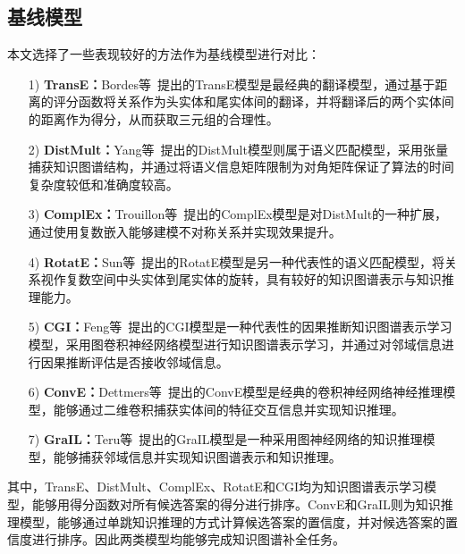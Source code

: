\documentclass[algorithmlist, AutoFakeBold, AutoFakeSlant, figurelist, tablelist, nomlist, engineering]{seuthesix}
\begin{document}
\subsection{基线模型}
本文选择了一些表现较好的方法作为基线模型进行对比：
\begin{itemize}
  \item [1)]\textbf{TransE：}Bordes等~\cite{bordes2013translating}提出的TransE模型是最经典的翻译模型，通过基于距离的评分函数将关系作为头实体和尾实体间的翻译，并将翻译后的两个实体间的距离作为得分，从而获取三元组的合理性。
  \item [2)]\textbf{DistMult：}Yang等~\cite{yang2015embedding}提出的DistMult模型则属于语义匹配模型，采用张量捕获知识图谱结构，并通过将语义信息矩阵限制为对角矩阵保证了算法的时间复杂度较低和准确度较高。
  \item [3)]\textbf{ComplEx：}Trouillon等~\cite{trouillon2016complex}提出的ComplEx模型是对DistMult的一种扩展，通过使用复数嵌入能够建模不对称关系并实现效果提升。
  \item [4)]\textbf{RotatE：}Sun等~\cite{sun2018rotate}提出的RotatE模型是另一种代表性的语义匹配模型，将关系视作复数空间中头实体到尾实体的旋转，具有较好的知识图谱表示与知识推理能力。
  \item [5)]\textbf{CGI：}Feng等~\cite{feng2021should}提出的CGI模型是一种代表性的因果推断知识图谱表示学习模型，采用图卷积神经网络模型进行知识图谱表示学习，并通过对邻域信息进行因果推断评估是否接收邻域信息。
  \item [6)]\textbf{ConvE：}Dettmers等~\cite{dettmers2018convolutional}提出的ConvE模型是经典的卷积神经网络神经推理模型，能够通过二维卷积捕获实体间的特征交互信息并实现知识推理。
  \item [7)]\textbf{GraIL：}Teru等~\cite{teru2020inductive}提出的GraIL模型是一种采用图神经网络的知识推理模型，能够捕获邻域信息并实现知识图谱表示和知识推理。
\end{itemize}
其中，TransE、DistMult、ComplEx、RotatE和CGI均为知识图谱表示学习模型，能够用得分函数对所有候选答案的得分进行排序。ConvE和GraIL则为知识推理模型，能够通过单跳知识推理的方式计算候选答案的置信度，并对候选答案的置信度进行排序。因此两类模型均能够完成知识图谱补全任务。
\end{document}
